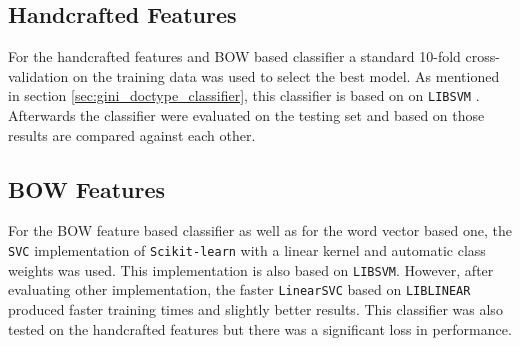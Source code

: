 


\subsection{Handcrafted Features}

For the handcrafted features and \ac{BOW} based classifier a standard 10-fold
cross-validation  on the training data  was used to select the best model.
As mentioned in section \ref{sec:gini_doctype_classifier}, this classifier is
based on  on \texttt{LIBSVM} \cite{CC01a}.
Afterwards the classifier were evaluated on the testing set and based on
those results are compared against each other.

\subsection{\ac{BOW} Features}

For the \ac{BOW} feature based classifier as well as for the word vector
based one, the  \texttt{SVC} implementation of  \texttt{Scikit-learn}
with a linear kernel and automatic class weights was used. This
implementation is also  based on \texttt{LIBSVM}. However, after evaluating
other implementation, the  faster \texttt{LinearSVC} based on \texttt{LIBLINEAR}
\cite{Fan:2008:LLL:1390681.1442794}  produced faster training times
and slightly better results. This classifier was also tested on the
handcrafted features but there was a significant loss in performance.


